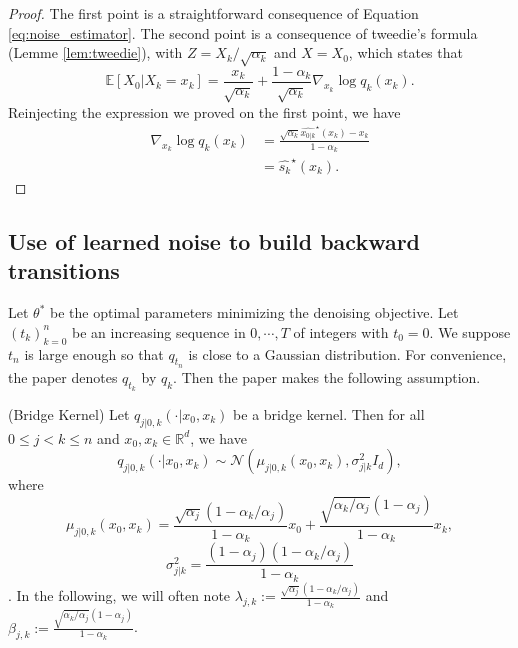 \documentclass[12pt]{article}
\begin{document}
\begin{proof}
    The first point is a straightforward consequence of Equation \eqref{eq:noise_estimator}.
    The second point is a consequence of tweedie's formula (Lemme \ref{lem:tweedie}), with $Z = X_k/\sqrt{\alpha_k}$ and $X=X_0$, which states that
    $$\mathbb{E}[X_0| X_k = x_k] = \frac{x_k}{\sqrt{\alpha_k}} + \frac{1 - \alpha_k}{\sqrt{\alpha_k}} \nabla_{x_k} \log q_k(x_k).$$
    Reinjecting the expression we proved on the first point, we have
    \begin{align*}
    \nabla_{x_k} \log q_k(x_k)
    & = \frac{\sqrt{\alpha_k}\hat{x_{0|k}}^\star (x_k) - x_k}{1 - \alpha_k} \\
    & = \hat{s_k}^\star (x_k).
    \end{align*}
\end{proof}

\subsection{Use of learned noise to build backward transitions}

Let $\theta^*$ be the optimal parameters minimizing the denoising objective.
Let $(t_k)_{k=0}^n$ be an increasing sequence in ${0, \cdots, T}$ of integers with $t_0 = 0$. 
We suppose $t_n$ is large enough so that $q_{t_n}$ is close to a Gaussian distribution. 
For convenience, the paper denotes $q_{t_k}$ by $q_k$.
Then the paper makes the following assumption.
\begin{assumption}(Bridge Kernel)
    \label{ass:bridge}
Let $q_{j|0,k}(\cdot | x_0, x_k)$ be a bridge kernel.
Then for all $0 \leq j < k \leq n$ and $x_0, x_k \in \mathbb{R}^d$, we have
$$q_{j|0,k}(\cdot | x_0, x_k) \sim \mathcal{N}\left( \mu_{j|0,k}(x_0, x_k), \sigma_{j|k}^2I_d \right),$$
where
$$\mu_{j|0,k}(x_0, x_k) = \frac{\sqrt{\alpha_j}(1 - \alpha_k/\alpha_j)}{1 - \alpha_k} x_0 
+ \frac{\sqrt{\alpha_k/\alpha_j}( 1- \alpha_j)}{1- \alpha_k} x_k,$$
$$\sigma^2_{j|k} = \frac{(1 - \alpha_j)(1 - \alpha_k/\alpha_j)}{1 - \alpha_k}$$.
In the following, we will often note $\lambda_{j,k} := \frac{\sqrt{\alpha_j}(1 - \alpha_k/\alpha_j)}{1 - \alpha_k}$
and $\beta_{j,k} := \frac{\sqrt{\alpha_k/\alpha_j}( 1- \alpha_j)}{1- \alpha_k}$.
\end{assumption}
\end{document}
